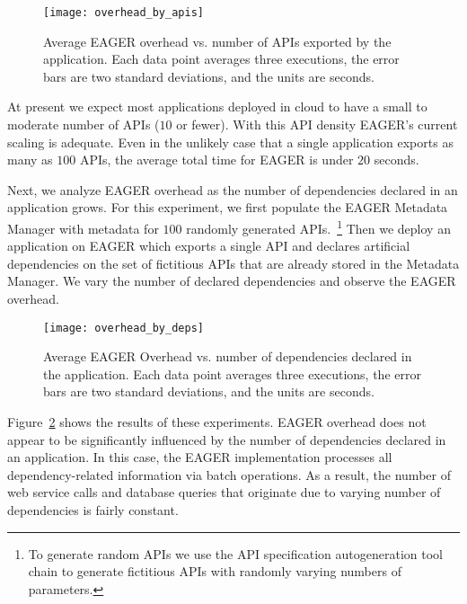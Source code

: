 \begin{figure}
\centering
\texttt{[image: overhead\_by\_apis]}
\caption{Average EAGER overhead vs. number of APIs exported by the
application.  Each data point averages three executions, the error bars 
are two standard deviations, and the units are seconds.}
\label{fig:overhead_by_apis}
\vspace{-0.2in}
\end{figure}

At present we expect most applications deployed in cloud to have a small to 
moderate number of APIs ($10$ or fewer).  With this API density EAGER's current 
scaling is adequate.  Even in the
unlikely case that a single application exports as many as $100$ APIs,
the average total time for EAGER is under $20$ seconds.

Next, we analyze EAGER overhead as the number of dependencies declared in
an application grows. For this experiment, we first populate the EAGER
Metadata Manager with metadata for $100$ randomly 
generated APIs.~\footnote{To generate random APIs we use the API specification
autogeneration tool chain to generate
fictitious APIs with randomly varying numbers of parameters.}
Then we
deploy an application on EAGER which exports a single API and declares
artificial dependencies on the set of fictitious 
APIs that are already stored in the Metadata Manager. We
vary the number of declared dependencies and observe the EAGER overhead.

\begin{figure}
\centering
\texttt{[image: overhead\_by\_deps]}
\caption{Average EAGER Overhead vs. number of dependencies declared in the
application.  Each data point averages three executions, the error bars are
two standard deviations, and the units are seconds.}
\label{fig:overhead_by_deps}
\vspace{-0.2in}
\end{figure}

Figure~\ref{fig:overhead_by_deps} shows the results of these experiments. 
EAGER overhead does not appear to be significantly
influenced by the number of dependencies declared in an application. 
In this case, the EAGER implementation processes
all dependency-related information via batch operations. 
As a result, the number of web service calls and database queries that originate 
due to varying number of dependencies is fairly constant. 

